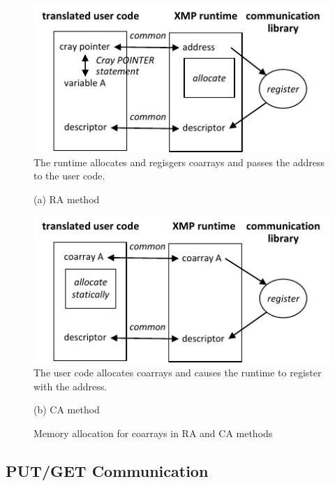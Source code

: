 \begin{figure}[tbh]
 \begin{center}
  \includegraphics[scale=0.9, trim=0mm 0mm 0mm 0mm, clip]{figs/register-RA-tmp.pdf}\\
The runtime allocates and regisgers coarrays and passes the address to the user code.
 \end{center}
 \begin{center}
(a) RA method
 \end{center}
 \begin{center}
  \includegraphics[scale=0.9, trim=0mm 0mm 0mm 0mm, clip]{figs/register-CA-tmp.pdf}\\
The user code allocates coarrays and causes the runtime to register with the address.
 \end{center}
 \begin{center}
(b) CA method
 \end{center}
 \caption{Memory allocation for coarrays in RA and CA methods}
 \label{fig:register-RA-CA}
\end{figure}


\subsection{PUT/GET Communication}

